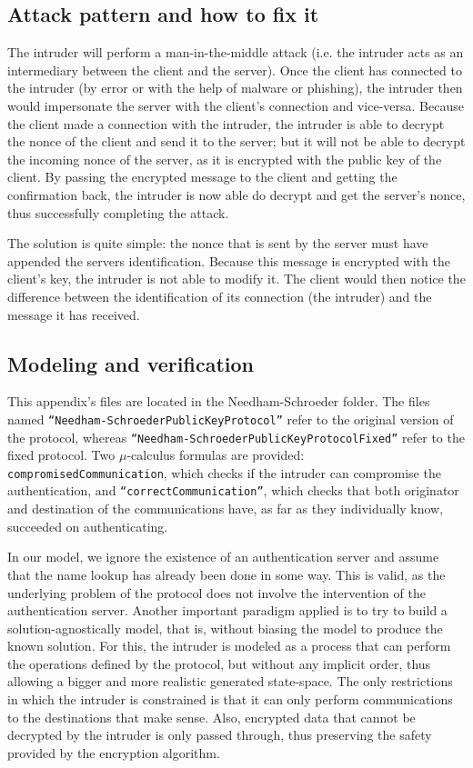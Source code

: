 \documentclass[11pt]{article}
\theoremstyle{definition}
\theoremstyle{plain}
\theoremstyle{definition}
\begin{document}
\begin{appendices}
\subsection{Attack pattern and how to fix it}

The intruder will perform a man-in-the-middle attack (i.e. the intruder acts as an intermediary between the client and the server). Once the client has connected to the intruder (by error or with the help of malware or phishing), the intruder then would impersonate the server with the client's connection and vice-versa. Because the client made a connection with the intruder, the intruder is able to decrypt the nonce of the client and send it to the server; but it will not be able to decrypt the incoming nonce of the server, as it is encrypted with the public key of the client. By passing the encrypted message to the client and getting the confirmation back, the intruder is now able do decrypt and get the server's nonce, thus successfully completing the attack.

The solution is quite simple: the nonce that is sent by the server must have appended the servers identification. Because this message is encrypted with the client's key, the intruder is not able to modify it. The client would then notice the difference between the identification of its connection (the intruder) and the message it has received.

\subsection{Modeling and verification}

This appendix's files are located in the Needham-Schroeder folder. The files named \texttt{``Needham-SchroederPublicKeyProtocol''} refer to the original version of the protocol, whereas \texttt{``Needham-SchroederPublicKeyProtocolFixed''} refer to the fixed protocol. Two $ \mu $-calculus formulas are provided: \texttt{compromisedCommunication}, which checks if the intruder can compromise the authentication, and \texttt{``correctCommunication''}, which checks that both originator and destination of the communications have, as far as they individually know, succeeded on authenticating.

In our model, we ignore the existence of an authentication server and assume that the name lookup has already been done in some way. This is valid, as the underlying problem of the protocol does not involve the intervention of the authentication server. Another important paradigm applied is to try to build a solution-agnostically model, that is, without biasing the model to produce the known solution. For this, the intruder is modeled as a process that can perform the operations defined by the protocol, but without any implicit order, thus allowing a bigger and more realistic generated state-space. The only restrictions in which the intruder is constrained is that it can only perform communications to the destinations that make sense. Also, encrypted data that cannot be decrypted by the intruder is only passed through, thus preserving the safety provided by the encryption algorithm.


\end{appendices}
\end{document}
